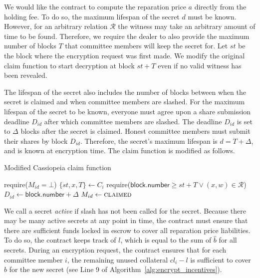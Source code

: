 We would like the contract to compute the reparation price $a$ directly from the holding fee.
To do so, the maximum lifespan of the secret $d$ must be known.
However, for an arbitrary relation $\mathcal{R}$ the witness may take an arbitrary amount of time to be found.
Therefore, we require the dealer to also provide the maximum number of blocks $T$ that committee members will keep the secret for.
Let $st$ be the block where the encryption request was first made.
We modify the original \textsf{claim} function to start decryption at block $st + T$ even if no valid witness has been revealed.

The lifespan of the secret also includes the number of blocks between when the secret is claimed and when committee members are slashed.
For the maximum lifespan of the secret to be known, everyone must agree upon a share submission deadline $D_{id}$ after which committee members are slashed.
The deadline $D_{id}$ is set to $\Delta$ blocks after the secret is claimed.
Honest committee members must submit their shares by block $D_{id}$.
Therefore, the secret's maximum lifespan is $d = T + \Delta$, and is known at encryption time.
The \textsf{claim} function is modified as follows.

\begin{algorithm}[H]
\caption{Modified Cassiopeia \textsf{claim} function}
    \begin{algorithmic}[1]
                \State require($M_{id} = \bot$)
                \State $\{st, x, T\} \gets C_i$
                \State require($\textsf{block.number} \geq st + T \lor (x, w) \in \mathcal{R}$)
                \State $D_{id} \gets \textsf{block.number} + \Delta$
                \State $M_{id} \gets \textsc{claimed}$
            \EndFunction
    \end{algorithmic}
\end{algorithm}

We call a secret \emph{active} if \textsf{slash} has not been called for the secret.
Because there may be many active secrets at any point in time, the contract must ensure that there are sufficient funds locked in escrow to cover all reparation price liabilities.
To do so, the contract keeps track of $l$, which is equal to the sum of $\hat{b}$ for all secrets.
During an encryption request, the contract ensures that for each committee member $i$, the remaining unused collateral $cl_i - l$ is sufficient to cover $\hat{b}$ for the new secret (see Line 9 of Algorithm~\ref{alg:encrypt_incentives}).


